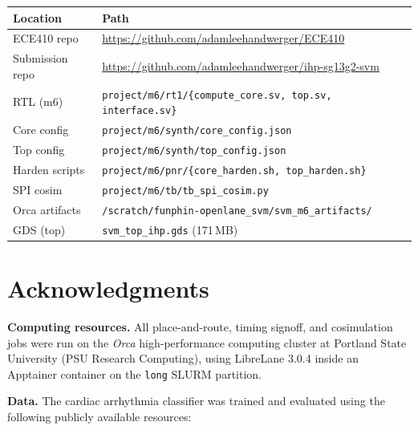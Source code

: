 \documentclass[11pt]{article}
\begin{document}
\begin{table}[H]
  \centering
  \small
  \begin{tabular}{ll}
    \toprule
    Location & Path \\
    \midrule
    ECE410 repo & \url{https://github.com/adamleehandwerger/ECE410} \\
    Submission repo & \url{https://github.com/adamleehandwerger/ihp-sg13g2-svm} \\
    RTL (m6) & \texttt{project/m6/rt1/\{compute\_core.sv, top.sv, interface.sv\}} \\
    Core config & \texttt{project/m6/synth/core\_config.json} \\
    Top config & \texttt{project/m6/synth/top\_config.json} \\
    Harden scripts & \texttt{project/m6/pnr/\{core\_harden.sh, top\_harden.sh\}} \\
    SPI cosim & \texttt{project/m6/tb/tb\_spi\_cosim.py} \\
    Orca artifacts & \texttt{/scratch/funphin-openlane\_svm/svm\_m6\_artifacts/} \\
    GDS (top) & \texttt{svm\_top\_ihp.gds} (171\,MB) \\
    \bottomrule
  \end{tabular}
\end{table}

\section*{Acknowledgments}

\noindent\textbf{Computing resources.}
All place-and-route, timing signoff, and cosimulation jobs were run on the
\emph{Orca} high-performance computing cluster at Portland State University
(PSU Research Computing), using LibreLane 3.0.4 inside an Apptainer
container on the \texttt{long} SLURM partition.

\medskip
\noindent\textbf{Data.}
The cardiac arrhythmia classifier was trained and evaluated using the following
publicly available resources:
\end{document}
